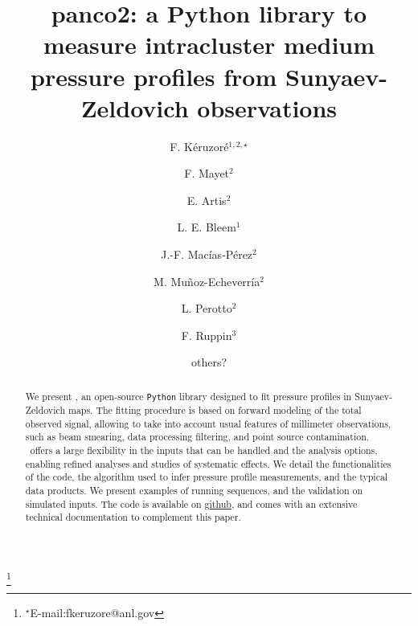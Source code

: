\documentclass[numberedappendix,twocolumn,twocolappendix,apj]{openjournal}
\begin{document}
\title{panco2: a Python library to measure intracluster medium pressure profiles from Sunyaev-Zeldovich observations}

\author{F. K\'eruzor\'e$^{1,2,\star}$}
\author{F. Mayet$^{2}$}
\author{E. Artis$^{2}$}
\author{L. E. Bleem$^{1}$}
\author{J.-F. Mac\'ias-P\'erez$^{2}$}
\author{M. Mu\~noz-Echeverr\'ia$^{2}$}
\author{L. Perotto$^{2}$}
\author{F. Ruppin$^{3}$}
\author{others?}

\thanks{$^{\star}$E-mail:fkeruzore@anl.gov}



\begin{abstract}
    We present \panco, an open-source \texttt{Python} library designed to fit pressure profiles in Sunyaev-Zeldovich maps.
    The fitting procedure is based on forward modeling of the total observed signal, allowing to take into account usual features of millimeter observations, such as beam smearing, data processing filtering, and point source contamination.
    \panco\ offers a large flexibility in the inputs that can be handled and the analysis options, enabling refined analyses and studies of systematic effects.
    We detail the functionalities of the code, the algorithm used to infer pressure profile measurements, and the typical data products.
    We present examples of running sequences, and the validation on simulated inputs.
    The code is available on \href{https://github.com/fkeruzore/panco2}{github}, and comes with an extensive technical documentation to complement this paper.
\end{abstract}


\maketitle

\vspace{1cm}
\end{document}
